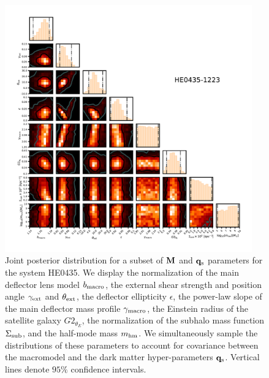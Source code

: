 \begin{figure}
	\includegraphics[clip,trim=1.5cm 1.6cm 1cm
	1cm,width=0.95\textwidth,keepaspectratio]{./figures_wdmchillsout/joint0435.pdf}
	\caption{\label{fig:0435inf} Joint posterior distribution for a subset of ${\bf{M}}$ and ${\bf{q}_{\rm{s}}}$ parameters for the system HE0435. We display the normalization of the main deflector lens model $b_{\rm{macro}}$, the external shear strength and position angle $\gamma_{\rm{ext}}$ and $\theta_{\rm{ext}}$, the deflector ellipticity $\epsilon$, the power-law slope of the main deflector mass profile $\gamma_{\rm{macro}}$, the Einstein radius of the satellite galaxy $G2_{\theta_E}$, the normalization of the subhalo mass function $\Sigma_{\rm{sub}}$, and the half-mode mass ${m_{\rm{hm}}}$. We simultaneously sample the distributions of these parameters to account for covariance between the macromodel and the dark matter hyper-parameters ${\bf{q}_{\rm{s}}}$. Vertical lines denote $95\%$ confidence intervals.}
\end{figure}	
